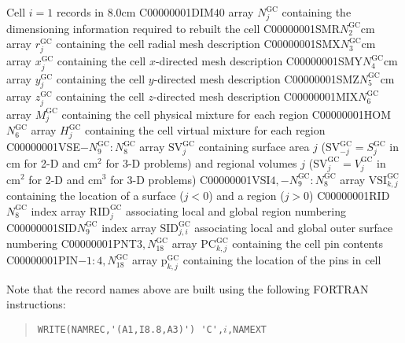 \begin{DescriptionEnregistrement}{Cell $i=1$ records in }{8.0cm}\label{tabl:NXTCell}
\IntEnr
  {C00000001DIM}{$40$}
  {array $N^{\text{GC}}_{j}$ containing the dimensioning information required to rebuilt the cell} 
\DbleEnr
  {C00000001SMR}{$N^{\text{GC}}_{2}$}{cm}
  {array $r^{\text{GC}}_{j}$ containing the cell radial mesh description}
\DbleEnr
  {C00000001SMX}{$N^{\text{GC}}_{3}$}{cm}
  {array $x^{\text{GC}}_{j}$ containing the cell $x$-directed mesh description}
\DbleEnr
  {C00000001SMY}{$N^{\text{GC}}_{4}$}{cm}
  {array $y^{\text{GC}}_{j}$ containing the cell $y$-directed mesh description}
\DbleEnr
  {C00000001SMZ}{$N^{\text{GC}}_{5}$}{cm}
  {array $z^{\text{GC}}_{j}$ containing the cell $z$-directed mesh description}
\IntEnr
  {C00000001MIX}{$N^{\text{GC}}_{6}$}
  {array $M^{\text{GC}}_{j}$ containing the cell physical mixture for each region}
\IntEnr
  {C00000001HOM}{$N^{\text{GC}}_{6}$}
  {array $H^{\text{GC}}_{j}$ containing the cell virtual mixture for each region}
\DbleEnr
  {C00000001VSE}{$-N^{\text{GC}}_{9}:N^{\text{GC}}_{8}$}{}
  {array $\text{SV}^{\text{GC}}_{j}$ containing surface area $j$ ($\text{SV}^{\text{GC}}_{-j}=S^{\text{GC}}_{j}$ in cm for 2-D and cm$^{2}$ for 3-D problems) and
regional volumes $j$ ($\text{SV}^{\text{GC}}_{j}=V^{\text{GC}}_{j}$ in cm$^{2}$ for 2-D and cm$^{3}$ for 3-D problems)}
\IntEnr
  {C00000001VSI}{$4,-N^{\text{GC}}_{9}:N^{\text{GC}}_{8}$}
  {array $\text{VSI}^{\text{GC}}_{k,j}$ containing the location of a surface ($j<0$) and a region ($j>0$)}
\IntEnr
  {C00000001RID}{$N^{\text{GC}}_{8}$}
  {index array $\text{RID}^{\text{GC}}_{j}$ associating local and global region numbering}
\IntEnr
  {C00000001SID}{$N^{\text{GC}}_{9}$}
  {index array $\text{SID}^{\text{GC}}_{j,i}$ associating local and global outer surface numbering}
\IntEnr
  {C00000001PNT}{$3,N^{\text{GC}}_{18}$}
  {array $\text{PC}^{\text{GC}}_{k,j}$ containing the cell pin contents}
\DbleEnr
  {C00000001PIN}{$-1:4,N^{\text{GC}}_{18}$}{}
  {array $\text{p}^{\text{GC}}_{k,j}$ containing the location of the pins in cell}
\end{DescriptionEnregistrement}
Note that the record names above are built using the following FORTRAN instructions:
  \begin{quote}
    \verb|WRITE(NAMREC,'(A1,I8.8,A3)') 'C',|$i$\verb|,NAMEXT|
  \end{quote}

